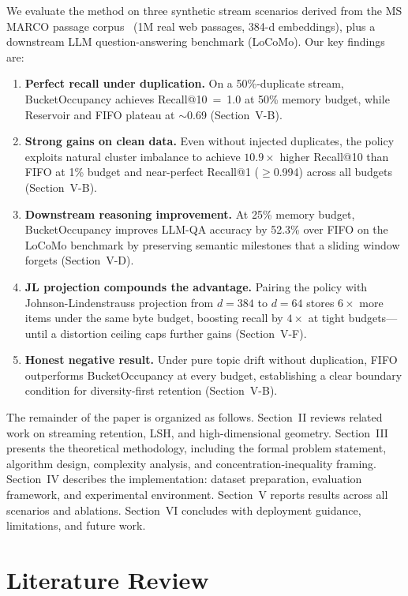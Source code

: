 \documentclass[conference]{IEEEtran}
\begin{document}
We evaluate the method on three synthetic stream scenarios derived from
the MS MARCO passage corpus~\cite{b17} (1M real web passages, 384-d
embeddings), plus a downstream LLM question-answering benchmark
(LoCoMo). Our key findings are:

\begin{enumerate}
\item \textbf{Perfect recall under duplication.}
      On a 50\%-duplicate stream, BucketOccupancy achieves
      Recall@10~=~1.0 at 50\% memory budget, while Reservoir and FIFO
      plateau at $\sim$0.69 (Section~V-B).
\item \textbf{Strong gains on clean data.}
      Even without injected duplicates, the policy exploits natural
      cluster imbalance to achieve $10.9\times$ higher Recall@10 than
      FIFO at 1\% budget and near-perfect Recall@1 ($\ge$0.994) across
      all budgets (Section~V-B).
\item \textbf{Downstream reasoning improvement.}
      At 25\% memory budget, BucketOccupancy improves LLM-QA accuracy
      by 52.3\% over FIFO on the LoCoMo benchmark by preserving
      semantic milestones that a sliding window forgets
      (Section~V-D).
\item \textbf{JL projection compounds the advantage.}
      Pairing the policy with Johnson-Lindenstrauss projection from
      $d{=}384$ to $d{=}64$ stores $6\times$ more items under the same
      byte budget, boosting recall by $4\times$ at tight budgets---until
      a distortion ceiling caps further gains (Section~V-F).
\item \textbf{Honest negative result.}
      Under pure topic drift without duplication, FIFO outperforms
      BucketOccupancy at every budget, establishing a clear boundary
      condition for diversity-first retention (Section~V-B).
\end{enumerate}

The remainder of the paper is organized as follows.
Section~II reviews related work on streaming retention, LSH, and
high-dimensional geometry.
Section~III presents the theoretical methodology, including the formal
problem statement, algorithm design, complexity analysis, and
concentration-inequality framing.
Section~IV describes the implementation: dataset preparation, evaluation
framework, and experimental environment.
Section~V reports results across all scenarios and ablations.
Section~VI concludes with deployment guidance, limitations, and future
work.

\section{Literature Review}
\end{document}
